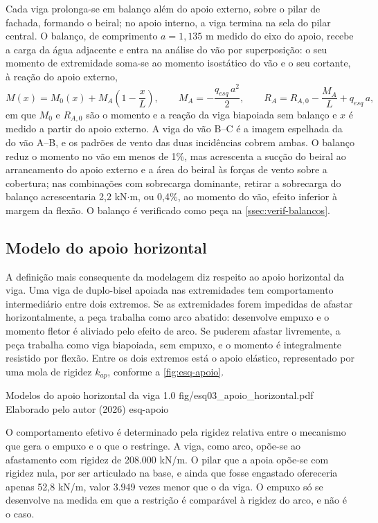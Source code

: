 Cada viga prolonga-se em balanço além do apoio externo, sobre o pilar de
fachada, formando o beiral; no apoio interno, a viga termina na sela do pilar
central. O balanço, de comprimento $a = 1{,}135$ m medido do eixo do apoio,
recebe a carga da água adjacente e entra na análise do vão por
superposição: o seu momento de extremidade soma-se ao momento isostático do vão
e o seu cortante, à reação do apoio externo,
\begin{equation}\label{eq:balanco-superposicao}
M(x) = M_0(x) + M_A\left(1 - \frac{x}{L}\right), \qquad
M_A = -\frac{q_{esq}\,a^2}{2}, \qquad
R_A = R_{A,0} - \frac{M_A}{L} + q_{esq}\,a ,
\end{equation}
em que $M_0$ e $R_{A,0}$ são o momento e a reação da viga biapoiada sem
balanço e $x$ é medido a partir do apoio externo. A viga do vão B--C é a imagem
espelhada da do vão A--B, e os padrões de vento das duas incidências cobrem
ambas. O balanço reduz o momento no vão em menos de 1\%, mas acrescenta a
sucção do beiral ao arrancamento do apoio externo e a área do beiral às forças
de vento sobre a cobertura; nas combinações com sobrecarga dominante, retirar a
sobrecarga do balanço acrescentaria 2,2 kN$\cdot$m, ou 0,4\%, ao momento do vão,
efeito inferior à margem da flexão. O balanço é verificado como peça na
\autoref{ssec:verif-balancos}.

\subsection{Modelo do apoio horizontal}\label{ssec:modelo-apoio}

A definição mais consequente da modelagem diz respeito ao apoio horizontal da
viga. Uma viga de duplo-bisel apoiada nas extremidades tem comportamento
intermediário entre dois extremos. Se as extremidades forem impedidas de afastar
horizontalmente, a peça trabalha como arco abatido: desenvolve empuxo e o
momento fletor é aliviado pelo efeito de arco. Se puderem afastar livremente, a
peça trabalha como viga biapoiada, sem empuxo, e o momento é integralmente
resistido por flexão. Entre os dois extremos está o apoio elástico, representado
por uma mola de rigidez $k_{ap}$, conforme a \autoref{fig:esq-apoio}.

\figura
{Modelos do apoio horizontal da viga}
{1.0}
{fig/esq03_apoio_horizontal.pdf}
{Elaborado pelo autor (2026)}
{esq-apoio}
{}
{}

O comportamento efetivo é determinado pela rigidez relativa entre o mecanismo
que gera o empuxo e o que o restringe. A viga, como arco, opõe-se ao afastamento
com rigidez de 208.000 kN/m. O pilar que a apoia opõe-se com rigidez nula, por
ser articulado na base, e ainda que fosse engastado ofereceria apenas
52,8 kN/m, valor 3.949 vezes menor que o da viga. O empuxo só se desenvolve na
medida em que a restrição é comparável à rigidez do arco, e não é o caso.

